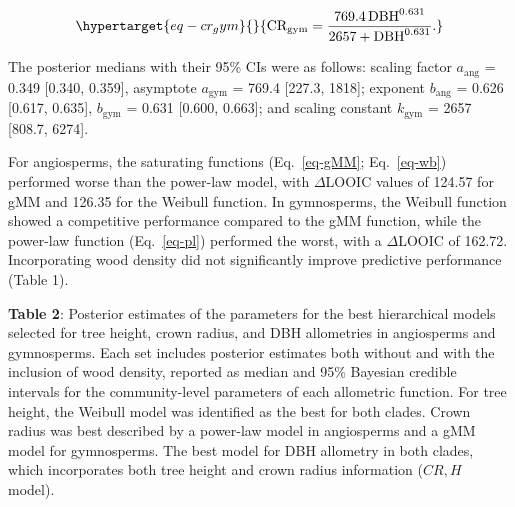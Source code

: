 \documentclass[
  12pt,
  letterpaper,
  DIV=11,
  numbers=noendperiod]{scrartcl}
\begin{document}
\begin{equation}\protect\hypertarget{eq-cr_gym}{}{
\mathrm{CR_{gym}} = \frac{\mathrm{769.4}
\, \mathrm{DBH}^{\mathrm{0.631}}}
{\mathrm{2657}
+ \mathrm{DBH}^{\mathrm{0.631}}}.
}\label{eq-cr_gym}\end{equation}

The posterior medians with their 95\% CIs were as follows: scaling
factor \(a_{\text{ang}}\) = 0.349 {[}0.340, 0.359{]}, asymptote
\(a_{\text{gym}}\) = 769.4 {[}227.3, 1818{]}; exponent
\(b_{\text{ang}}\) = 0.626 {[}0.617, 0.635{]}, \(b_{\text{gym}}\) =
0.631 {[}0.600, 0.663{]}; and scaling constant \(k_{\text{gym}}\) = 2657
{[}808.7, 6274{]}.

For angiosperms, the saturating functions (Eq.~\ref{eq-gMM};
Eq.~\ref{eq-wb}) performed worse than the power-law model, with
\(\Delta\)LOOIC values of 124.57 for gMM and 126.35 for the Weibull
function. In gymnosperms, the Weibull function showed a competitive
performance compared to the gMM function, while the power-law function
(Eq.~\ref{eq-pl}) performed the worst, with a \(\Delta\)LOOIC of 162.72.
Incorporating wood density did not significantly improve predictive
performance (Table 1).

\textbf{Table 2}: Posterior estimates of the parameters for the best
hierarchical models selected for tree height, crown radius, and DBH
allometries in angiosperms and gymnosperms. Each set includes posterior
estimates both without and with the inclusion of wood density, reported
as median and 95\% Bayesian credible intervals for the community-level
parameters of each allometric function. For tree height, the Weibull
model was identified as the best for both clades. Crown radius was best
described by a power-law model in angiosperms and a gMM model for
gymnosperms. The best model for DBH allometry in both clades, which
incorporates both tree height and crown radius information (\(CR,H\)
model).

\newpage

\begingroup\fontsize{10}{12}\selectfont
\end{document}
